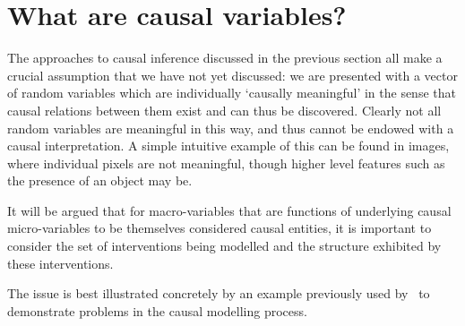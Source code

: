 %
%
%




\section{What are causal variables?}\label{sec:causality-what-are-causal-vars}

The approaches to causal inference discussed in the previous section all make a crucial assumption that we have not yet discussed: we are presented with a vector of random variables which are individually `causally meaningful' in the sense that causal relations between them exist and can thus be discovered. 
Clearly not all random variables are meaningful in this way, and thus cannot be endowed with a causal interpretation.
A simple intuitive example of this can be found in images, where individual pixels are not meaningful, though higher level features such as the presence of an object may be.

It will be argued that for macro-variables that are functions of underlying causal micro-variables to be themselves considered causal entities, it is important to consider the set of interventions being modelled and the structure exhibited by these interventions.

The issue is best illustrated concretely by an example previously used by~\cite{spirtes2004causal} to demonstrate problems in the causal modelling process.


